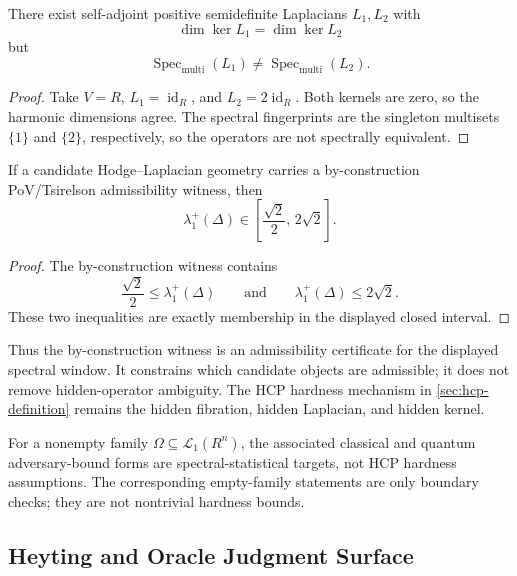 \begin{proposition}\label{prop:spectrum-not-determined-by-kernel-dimension}
  There exist self-adjoint positive semidefinite Laplacians \(L_1,L_2\) with
  \[
    \dim\ker L_1=\dim\ker L_2
  \]
  but
  \[
    \operatorname{Spec}_{\mathrm{multi}}(L_1)
    \ne
    \operatorname{Spec}_{\mathrm{multi}}(L_2).
  \]
\end{proposition}

\begin{proof}
  Take \(V=R\), \(L_1=\operatorname{id}_R\), and
  \(L_2=2\operatorname{id}_R\). Both kernels are zero, so the harmonic
  dimensions agree. The spectral fingerprints are the singleton multisets
  \(\{1\}\) and \(\{2\}\), respectively, so the operators are not spectrally
  equivalent.
\end{proof}

\begin{proposition}\label{prop:spectral-admissibility}
  If a candidate Hodge--Laplacian geometry carries a by-construction
  PoV/Tsirelson admissibility witness, then
  \[
    \lambda_1^+(\Delta)\in
    \left[\frac{\sqrt{2}}{2},\,2\sqrt{2}\right].
  \]
\end{proposition}

\begin{proof}
  The by-construction witness contains
  \[
    \frac{\sqrt{2}}{2}\le\lambda_1^+(\Delta)
    \qquad\text{and}\qquad
    \lambda_1^+(\Delta)\le 2\sqrt{2}.
  \]
  These two inequalities are exactly membership in the displayed closed
  interval.
\end{proof}

Thus the by-construction witness is an admissibility certificate for the
displayed spectral window. It constrains which candidate objects are admissible;
it does not remove hidden-operator ambiguity. The HCP hardness mechanism in
\cref{sec:hcp-definition} remains the hidden fibration, hidden Laplacian, and
hidden kernel.

For a nonempty family \(\Omega\subseteq\mathcal L_1(R^n)\), the associated
classical and quantum adversary-bound forms are spectral-statistical targets,
not HCP hardness assumptions. The corresponding empty-family statements are
only boundary checks; they are not nontrivial hardness bounds.

\subsection{Heyting and Oracle Judgment Surface}

